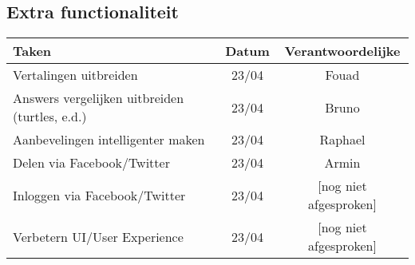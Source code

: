 \subsection{Extra functionaliteit}
\begin{tabular}{| l | c | c |}
    \hline
    Taken   &   Datum   &   Verantwoordelijke \\
    \hline \hline
    Vertalingen uitbreiden  &   23/04   &   Fouad   \\
    Answers vergelijken uitbreiden (turtles, e.d.)  &   23/04   &   Bruno   \\
    Aanbevelingen intelligenter maken   &   23/04   &   Raphael \\
    Delen via Facebook/Twitter  &   23/04   &   Armin   \\
    Inloggen via Facebook/Twitter   &   23/04   &   [nog niet afgesproken]  \\
    Verbetern UI/User Experience    &   23/04   &   [nog niet afgesproken]  \\
    \hline
\end{tabular}
